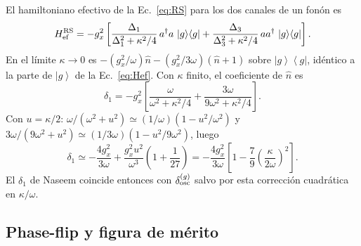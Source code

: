 \documentclass[11pt,a4paper]{article}
\newcommand{\ket}[1]{\left|#1\right\rangle}
\newcommand{\bra}[1]{\left\langle#1\right|}
\newcommand{\Pg}{\ket{g}\!\bra{g}}
\newcommand{\hn}{\hat n}
\newcommand{\Href}{H_{\mathrm{ef}}}
\theoremstyle{definition}
\begin{document}
El hamiltoniano efectivo de la Ec.~\eqref{eq:RS} para los dos canales de un fonón es
\begin{equation}
\Href^{\rm RS}=-g_x^2\left[\frac{\Delta_1}{\Delta_1^2+\kappa^2/4}\,a^{\dagger}a\,\Pg+\frac{\Delta_3}{\Delta_3^2+\kappa^2/4}\,aa^{\dagger}\,\Pg\right].
\end{equation}
En el límite $\kappa\to0$ es $-(g_x^2/\omega)\hn-(g_x^2/3\omega)(\hn+1)$ sobre $\Pg$, idéntico a la parte de $\ket{g}$ de la Ec.~\eqref{eq:Hef}. Con $\kappa$ finito, el coeficiente de $\hn$ es
\begin{equation}
\delta_1=-g_x^2\left[\frac{\omega}{\omega^2+\kappa^2/4}+\frac{3\omega}{9\omega^2+\kappa^2/4}\right].
\end{equation}
Con $u=\kappa/2$: $\omega/(\omega^2+u^2)\simeq(1/\omega)(1-u^2/\omega^2)$ y $3\omega/(9\omega^2+u^2)\simeq(1/3\omega)(1-u^2/9\omega^2)$, luego
\begin{equation}
\delta_1\simeq-\frac{4g_x^2}{3\omega}+\frac{g_x^2u^2}{\omega^3}\left(1+\frac1{27}\right)=-\frac{4g_x^2}{3\omega}\left[1-\frac79\left(\frac{\kappa}{2\omega}\right)^2\right].
\end{equation}
El $\delta_1$ de Naseem coincide entonces con $\delta_{\rm osc}^{(g)}$ salvo por esta corrección cuadrática en $\kappa/\omega$.

\subsection{Phase-flip y figura de mérito}
\label{sec:pf}
\end{document}

